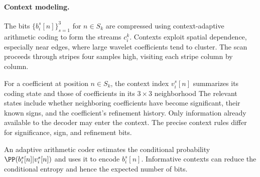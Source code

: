 \paragraph{Context modeling.}

The bits $\{ b_i^s[n] \}_{s=1}^3$ for $n\in S_k$ are compressed using context-adaptive arithmetic coding to form the streams $c_i^k$. Contexts exploit spatial dependence, especially near edges, where large wavelet coefficients tend to cluster. The scan proceeds through stripes four samples high, visiting each stripe column by column.




For a coefficient at position $n\in S_k$, the context index $v_i^s[n]$ summarizes its coding state and those of coefficients in its $3\times3$ neighborhood
The relevant states include whether neighboring coefficients have become significant, their known signs, and the coefficient's refinement history. Only information already available to the decoder may enter the context. The precise context rules differ for significance, sign, and refinement bits.

An adaptive arithmetic coder estimates the conditional probability $\PP( b_i^s[n] | v_i^s[n] )$ and uses it to encode $b_i^s[n]$. Informative contexts can reduce the conditional entropy and hence the expected number of bits.
